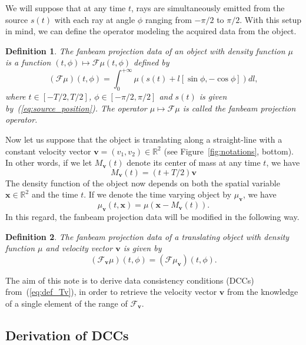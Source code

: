 \documentclass[twocolumn]{IEEEtran}
\newcommand{\R}{\mathbb{R}}
\newcommand{\bx}{\mathbf{x}}
\newcommand{\bv}{\mathbf{v}}
\newcommand{\Mbv}{M_{\mathbf{v}}}
\newcommand{\Tbv}{\mathcal{F}_{\mathbf{v}}}
\newcommand{\mubv}{\mu_{\mathbf{v}}}
\newtheorem{definition}{Definition}
\begin{document}
We will suppose that at any time $t$, rays are simultaneously emitted from the source $s(t)$ with each ray at angle $\phi$ ranging from $-\pi/2$ to $\pi/2$. With this setup in mind, we can define the operator modeling the acquired data from the object.
\begin{definition}
The \emph{fanbeam projection data} of an object with density function $\mu$ is a function $(t,\phi) \mapsto \mathcal{F}\mu(t,\phi)$ defined by
\begin{equation}
	(\mathcal{F}\mu)(t,\phi) = \int_0^{+\infty} \mu \left( s(t) + l \left[ \sin \phi, -\cos \phi \right] \right) dl,
\end{equation}
where $t \in \left[ -T/2, T/2\right]$, $\phi \in \left[ -\pi/2, \pi/2\right]$ and $s(t)$ is given by~(\ref{eq:source_position}). The operator $\mu \mapsto \mathcal{F}\mu$ is called the \emph{fanbeam projection operator}.
\end{definition}


Now let us suppose that the object is translating along a straight-line with a constant velocity vector $\bv = (v_1, v_2)\in \R^2$ (see Figure~\ref{fig:notations}, bottom). In other words, if we let $\Mbv(t)$ denote its center of mass at any time $t$, we have
\begin{equation}
	\Mbv(t) =   \left( t + T/2 \right) \bv
\label{eq:center_of_mass}
\end{equation}
The density function of the object now depends on both the spatial variable $\bx \in \R^2$ and the time $t$. If we denote the time varying object by $\mubv$, we have
\begin{equation}
	\mubv(t,\bx) = \mu\left( \bx - \Mbv(t)\right).
\end{equation}
In this regard, the fanbeam projection data will be modified in the following way.
\begin{definition}
The \emph{fanbeam projection data of a translating object} with density function $\mu$ and  velocity vector $\bv$ is given by
\begin{equation}
	(\Tbv\mu)(t,\phi) =  ( \mathcal{F} \mubv ) (t,\phi).
\label{eq:def_Tv}
\end{equation}
\end{definition}

The aim of this note is to derive data consistency conditions (DCCs) from~(\ref{eq:def_Tv}), in order to retrieve the velocity vector $\bv$ from the knowledge of a single element of the range of $\Tbv$.

\subsection{Derivation of DCCs}
\end{document}
